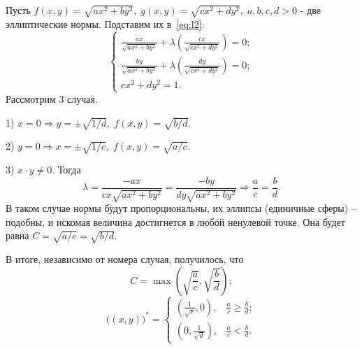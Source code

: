 \documentclass{article}
\begin{document}
Пусть $f(x,y) = \sqrt{ax^2+by^2}, \; g(x,y) = \sqrt{cx^2+dy^2}, \; a,b,c,d > 0$ - две эллиптические нормы. Подставим их в~\eqref{eq:l2}:
\begin{equation*}
	\begin{cases}
		\frac{ax}{\sqrt{ax^2+by^2}}+\lambda \left( \frac{cx}{\sqrt{cx^2+dy^2}} \right) = 0; \\
		\frac{by}{\sqrt{ax^2+by^2}}+\lambda \left( \frac{dy}{\sqrt{cx^2+dy^2}} \right) = 0; \\
		cx^2+dy^2 = 1.
	\end{cases}
\end{equation*}
Рассмотрим 3 случая.
\vspace{1mm}

1) $x = 0 \Rightarrow y = \pm\sqrt{1/d}, \; f(x,y) = \sqrt{b/d}. $

2) $y = 0 \Rightarrow x = \pm\sqrt{1/c}, \; f(x,y) = \sqrt{a/c}. $

3) $x \cdot y \neq 0$. Тогда
$$ \lambda = \frac{-ax}{cx\sqrt{ax^2+by^2}} = \frac{-by}{dy\sqrt{ax^2+by^2}} \Rightarrow \frac{a}{c} = \frac{b}{d}. $$ 
В таком случае нормы будут пропорциональны, их эллипсы (единичные сферы) -- подобны, и искомая величина достигнется в любой ненулевой точке. Она будет равна $C = \sqrt{a/c} = \sqrt{b/d}$.

В итоге, независимо от номера случая, получилось, что $$ C = \max\left(\sqrt{\frac{a}{c}}, \sqrt{\frac{b}{d}}\right); $$
\begin{equation*} \big((x,y)\big)^* =
	\begin{cases}
		\left(\frac{1}{\sqrt{c}}, 0\right), & \frac{a}{c} \geqslant \frac{b}{d}; \\[0.9ex]
		\left(0, \frac{1}{\sqrt{d}}\right), & \frac{a}{c} < \frac{b}{d}.
	\end{cases}
\end{equation*}
\vspace{1mm}
\end{document}

